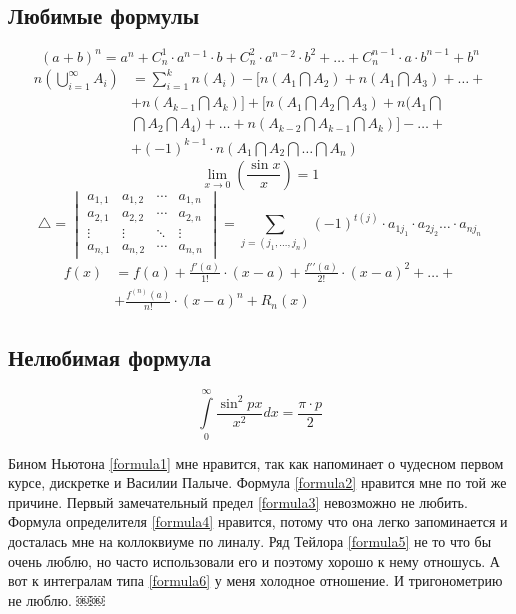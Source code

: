 \documentclass[12pt,a4paper]{article}
\begin{document}
\subsection{Любимые формулы}
\begin{equation}\label{formula1}
(a+b)^n=a^n + C^1_n \cdot a^{n-1} \cdot b + C^2_n \cdot a^{n-2} \cdot b^2 + \ldots + C^{n-1}_n \cdot a \cdot b^{n-1} + b^n
\end{equation}
\begin{equation}\label{formula2}
	\begin{aligned}
	n(\bigcup_{i=1}^{\infty}A_i) & =\sum_{i=1}^k n(A_i) - [n(A_1 \bigcap A_2) + n(A_1 \bigcap A_3) + \ldots +\\
	& + n(A_{k-1} \bigcap A_k)] +[n(A_1 \bigcap A_2 \bigcap A_3) + n(A_1 \bigcap \\
	& \bigcap A_2 \bigcap A_4) +  \ldots + n(A_{k-2} \bigcap A_{k-1} \bigcap A_k)] - \ldots +\\
	&+(-1)^{k-1} \cdot n(A_1 \bigcap A_2 \bigcap \ldots \bigcap A_n)
	\end{aligned}
\end{equation}
\begin{equation}\label{formula3}
\lim_{x \to 0} \left(\frac{\sin x}{x}\right)=1
\end{equation}
\begin{equation}\label{formula4}
\triangle =
 \begin{vmatrix}
  a_{1,1} & a_{1,2} & \cdots & a_{1,n} \\
  a_{2,1} & a_{2,2} & \cdots & a_{2,n} \\
  \vdots  & \vdots  & \ddots & \vdots  \\
  a_{n,1} & a_{n,2} & \cdots & a_{n,n}
 \end{vmatrix} = \sum_{j=(j_1, \ldots, j_n)}(-1)^{t(j)} \cdot a_{1j_1} \cdot a_{2j_2} \ldots \cdot a_{nj_n}
\end{equation}
\begin{equation}\label{formula5}
\begin{aligned}
f(x)&=f(a)+\frac{f\prime(a)}{1!}\cdot(x-a)+\frac{f\prime\prime(a)}{2!}\cdot(x-a)^2+\ldots+\\
&+\frac{f^{(n)}(a)}{n!}\cdot(x-a)^n+R_n(x)
\end{aligned}
\end{equation}
\subsection{Нелюбимая формула}
\begin{equation}\label{formula6}  
\int\limits_0^\infty
\frac{\sin^2px}{x^2}dx = \frac{\pi \cdot p}{2}
\end{equation}

Бином Ньютона \ref{formula1} мне нравится, так как напоминает о чудесном первом курсе, дискретке и Василии Палыче. Формула \ref{formula2} нравится мне по той же причине. Первый замечательный предел \ref{formula3} невозможно не любить. Формула определителя \ref{formula4} нравится, потому что она легко запоминается и досталась мне на коллоквиуме по линалу. Ряд Тейлора \ref{formula5} не то что бы очень люблю, но часто использовали его и поэтому хорошо к нему отношусь. А вот к интегралам типа \ref{formula6} у меня холодное отношение. И тригонометрию не люблю.
￼￼
\end{document}

